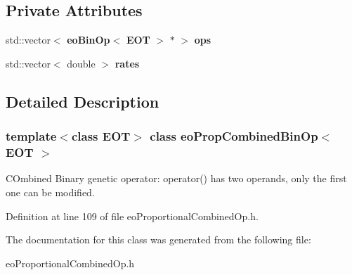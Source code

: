 \subsection*{Private Attributes}
\begin{CompactItemize}
\item 
std::vector$<$ {\bf eo\-Bin\-Op}$<$ {\bf EOT} $>$ $\ast$ $>$ {\bf ops}\label{classeo_prop_combined_bin_op_r0}

\item 
std::vector$<$ double $>$ {\bf rates}\label{classeo_prop_combined_bin_op_r1}

\end{CompactItemize}


\subsection{Detailed Description}
\subsubsection*{template$<$class EOT$>$ class eo\-Prop\-Combined\-Bin\-Op$<$ EOT $>$}

COmbined Binary genetic operator: operator() has two operands, only the first one can be modified. 



Definition at line 109 of file eo\-Proportional\-Combined\-Op.h.

The documentation for this class was generated from the following file:\begin{CompactItemize}
\item 
eo\-Proportional\-Combined\-Op.h\end{CompactItemize}

